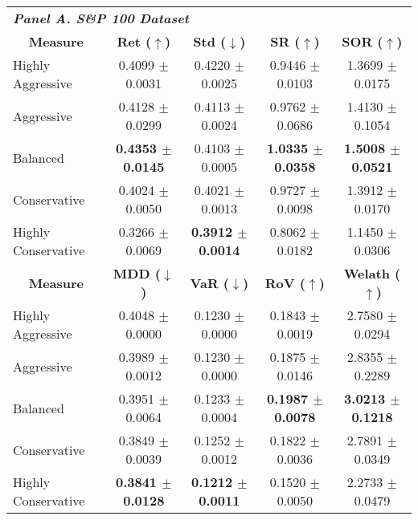 \centering
{\fontsize{8pt}{11pt}\selectfont
\begin{tabular}{lcccc}
\hline
\multicolumn{5}{l}{\textit{\textbf{Panel A. S\&P 100 Dataset}}}                                                                                                  \\
\multicolumn{1}{c}{\textbf{Measure}} & \textbf{Ret ($\uparrow$)}    & \textbf{Std ($\downarrow$)}  & \textbf{SR ($\uparrow$)}     & \textbf{SOR ($\uparrow$)}    \\ \hline
Highly Aggressive                    & 0.4099 $\pm$ 0.0031          & 0.4220 $\pm$ 0.0025          & 0.9446 $\pm$ 0.0103          & 1.3699 $\pm$ 0.0175          \\
Aggressive                           & 0.4128 $\pm$ 0.0299          & 0.4113 $\pm$ 0.0024          & 0.9762 $\pm$ 0.0686          & 1.4130 $\pm$ 0.1054          \\
Balanced                             & \textbf{0.4353 $\pm$ 0.0145} & 0.4103 $\pm$ 0.0005          & \textbf{1.0335 $\pm$ 0.0358} & \textbf{1.5008 $\pm$ 0.0521} \\
Conservative                         & 0.4024 $\pm$ 0.0050          & 0.4021 $\pm$ 0.0013          & 0.9727 $\pm$ 0.0098          & 1.3912 $\pm$ 0.0170          \\
Highly Conservative                  & 0.3266 $\pm$ 0.0069          & \textbf{0.3912 $\pm$ 0.0014} & 0.8062 $\pm$ 0.0182          & 1.1450 $\pm$ 0.0306          \\ \hline
\multicolumn{1}{c}{\textbf{Measure}} & \textbf{MDD ($\downarrow$)}  & \textbf{VaR ($\downarrow$)}  & \textbf{RoV ($\uparrow$)}    & \textbf{Welath ($\uparrow$)} \\ \hline
Highly Aggressive                    & 0.4048 $\pm$ 0.0000          & 0.1230 $\pm$ 0.0000          & 0.1843 $\pm$ 0.0019          & 2.7580 $\pm$ 0.0294          \\
Aggressive                           & 0.3989 $\pm$ 0.0012          & 0.1230 $\pm$ 0.0000          & 0.1875 $\pm$ 0.0146          & 2.8355 $\pm$ 0.2289          \\
Balanced                             & 0.3951 $\pm$ 0.0064          & 0.1233 $\pm$ 0.0004          & \textbf{0.1987 $\pm$ 0.0078} & \textbf{3.0213 $\pm$ 0.1218} \\
Conservative                         & 0.3849 $\pm$ 0.0039          & 0.1252 $\pm$ 0.0012          & 0.1822 $\pm$ 0.0036          & 2.7891 $\pm$ 0.0349          \\
Highly Conservative                  & \textbf{0.3841 $\pm$ 0.0128} & \textbf{0.1212 $\pm$ 0.0011} & 0.1520 $\pm$ 0.0050          & 2.2733 $\pm$ 0.0479          \\ \hline

\end{tabular}}
